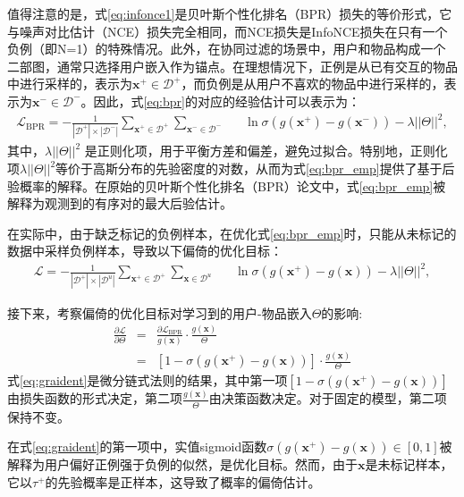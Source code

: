 值得注意的是，式\eqref{eq:infonce1}是贝叶斯个性化排名（BPR）损失的等价形式，它与噪声对比估计（NCE）损失\cite{Gutmann:2010:ICAIS}完全相同，而NCE损失是InfoNCE损失\cite{Oord:2018:arxiv}在只有一个负例（即N=1）的特殊情况。此外，在协同过滤的场景中，用户和物品构成一个二部图，通常只选择用户嵌入作为锚点。在理想情况下，正例是从已有交互的物品中进行采样的，表示为$\mathbf{x}^+ \in \mathcal{D}^+$，而负例是从用户不喜欢的物品中进行采样的，表示为$\mathbf{x}^- \in \mathcal{D}^-$。因此，式\eqref{eq:bpr}的对应的经验估计可以表示为：
\begin{eqnarray}\label{eq:bpr_emp}
	\mathcal{L}_\text{BPR} =- \frac{1}{|\mathcal{D}^+|\times |\mathcal{D}^-|} \sum_{\mathbf{x}^+ \in \mathcal{D}^+}\sum_{\mathbf{x}^- \in \mathcal{D}^-} && \ln \sigma(g(\mathbf{x}^+) - g(\mathbf{x}^-)) \nonumber  - \lambda ||\Theta||^2,
\end{eqnarray}
其中，$\lambda ||\Theta||^2$ 是正则化项，用于平衡方差和偏差，避免过拟合。特别地，正则化项$\lambda ||\Theta||^2$等价于高斯分布的先验密度的对数，从而为式\eqref{eq:bpr_emp}提供了基于后验概率的解释。在原始的贝叶斯个性化排名（BPR）论文\cite{Steffen:2009:UAI}中，式\eqref{eq:bpr_emp}被解释为观测到的有序对的最大后验估计。

在实际中，由于缺乏标记的负例样本，在优化式\eqref{eq:bpr_emp}时，只能从未标记的数据中采样负例样本，导致以下偏倚的优化目标：
\begin{eqnarray}\label{eq:bpr_emp_biased}
	\mathcal{L} =- \frac{1}{|\mathcal{D}^+|\times |\mathcal{D}^u|} \sum_{\mathbf{x}^+ \in \mathcal{D}^+}\sum_{\mathbf{x} \in \mathcal{D}^u} && \ln \sigma(g(\mathbf{x}^+) - g(\mathbf{x})) - \lambda ||\Theta||^2,
\end{eqnarray}

接下来，考察偏倚的优化目标对学习到的用户-物品嵌入$\Theta$的影响:
\begin{eqnarray}
	\frac{\partial \mathcal{L}}{\partial \Theta} &=& \frac{\partial \mathcal{L}_\text{BPR}}{g(\mathbf{x})}\cdot\frac{g(\mathbf{x})}{\Theta}  \\
	&=& [1-\sigma(g(\mathbf{x}^+) - g(\mathbf{x})) ]\cdot\frac{g(\mathbf{x})}{\Theta}  \label{eq:graident}
\end{eqnarray}
式\eqref{eq:graident}是微分链式法则的结果，其中第一项$[1-\sigma(g(\mathbf{x}^+) - g(\mathbf{x}))]$由损失函数的形式决定，第二项$\frac{g(\mathbf{x})}{\Theta}$由决策函数决定。对于固定的模型，第二项保持不变。

在式\eqref{eq:graident}的第一项中，实值sigmoid函数$\sigma(g(\mathbf{x}^+) - g(\mathbf{x})) \in [0,1]$被解释为用户偏好正例强于负例的似然\cite{Steffen:2009:UAI}，是优化目标。然而，由于$\mathbf{x}$是未标记样本，它以$\tau^+$的先验概率是正样本，这导致了概率的偏倚估计。

